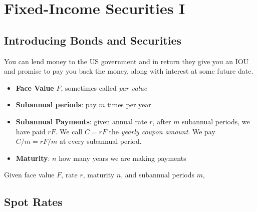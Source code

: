 
\chapter{Fixed-Income Securities I}



\section{Introducing Bonds and Securities}


You can lend money to the US government and in return they give you an IOU and 
promise to pay you back the money, along with interest at some future date. 

\begin{figure}[h]
\end{figure}


\begin{itemize}
\item \textbf{Face Value} $F$, sometimes called \textit{par value}
\item \textbf{Subannual periods}: pay $m$ times per year 
\item \textbf{Subannual Payments}: given annual rate $r$, after $m$ subannual periods, 
we have paid $rF$. We call $C = rF$ the \textit{yearly coupon amount}. 
We pay $C/m = rF/m$ at every subannual period. 
\item \textbf{Maturity}: $n$ how many years we are making payments
\end{itemize}

Given face value $F$, rate $r$, maturity $n$, and subannual periods $m$,

\section{Spot Rates}


